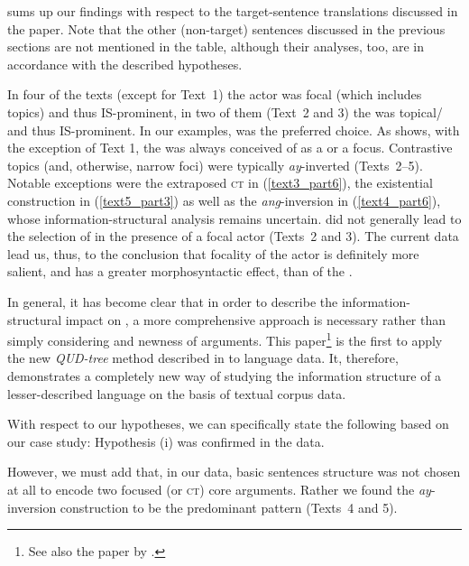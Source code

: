 \documentclass[output=paper,
,modfonts
,nonflat]{langsci/langscibook}
\begin{document}
\noindent {} sums up our findings with respect to the target-sentence translations discussed in the paper. Note that the other (non-target) sentences discussed in the previous sections are not mentioned in the table, although their analyses, too, are in accordance with the described hypotheses. 

In four of the texts (except for Text~1) the actor was focal (which includes  topics) and thus IS-prominent, in two of them (Text~2 and 3) the  was topical/ and thus IS-prominent.  In our examples,  was the preferred choice. As  shows, with the exception of Text 1, the  was always conceived of as a  or a focus. Contrastive topics (and, otherwise, narrow foci) were typically 
\textit{ay}-inverted (Texts~2--5). Notable exceptions were the extraposed \textsc{ct} in (\ref{text3_part6}), the existential construction in (\ref{text5_part3}) as well as the \textit{ang}-inversion in (\ref{text4_part6}), whose information-structural analysis remains uncertain.   did not generally lead to the selection of  in the presence of a focal actor (Texts~2 and 3). The current data lead us, thus, to the conclusion that focality of the actor is definitely more salient, and has a greater morphosyntactic effect, than  of the .

In general, it has become clear that in order to describe the information-structural impact on , a more comprehensive approach is necessary rather than simply considering  and newness of arguments. This paper\footnote{See also the paper by .} is the first to apply the new \textit{QUD-tree} method described in \cite{riear18b} to  language data. It, therefore, demonstrates a completely new way of studying the information structure of a lesser-described language on the basis of textual corpus data.

With respect to our hypotheses, we can specifically state the following based on our case study: Hypothesis (i) was confirmed in the data.


\noindent However, we must add that, in our data, basic sentences structure was not chosen at all 
to encode two focused (or \textsc{ct}) core arguments. Rather we found the \textit{ay}-inversion construction to be the predominant pattern (Texts~4 and 5).
\end{document}
